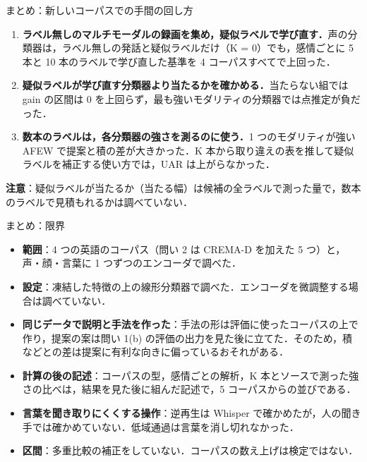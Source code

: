 \begin{frame}{まとめ：新しいコーパスでの手間の回し方}
\footnotesize
\begin{enumerate}\setlength\itemsep{5pt}
\item \textbf{ラベル無しのマルチモーダルの録画を集め，疑似ラベルで学び直す．}声の分類器は，ラベル無しの発話と疑似ラベルだけ（K = 0）でも，感情ごとに 5 本と 10 本のラベルで学び直した基準を 4 コーパスすべてで上回った．
\item \textbf{疑似ラベルが学び直す分類器より当たるかを確かめる．}当たらない組では gain の区間は 0 を上回らず，最も強いモダリティの分類器では点推定が負だった．
\item \textbf{数本のラベルは，各分類器の強さを測るのに使う．}1 つのモダリティが強い AFEW で提案と積の差が大きかった．K 本から取り違えの表を推して疑似ラベルを補正する使い方では，UAR は上がらなかった．
\end{enumerate}
\vspace{0.4em}
\textbf{注意}：疑似ラベルが当たるか（当たる幅）は候補の全ラベルで測った量で，数本のラベルで見積もれるかは調べていない．
\end{frame}

\begin{frame}{まとめ：限界}
\footnotesize
\begin{itemize}\setlength\itemsep{4pt}
\item \textbf{範囲}：4 つの英語のコーパス（問い 2 は CREMA-D を加えた 5 つ）と，声・顔・言葉に 1 つずつのエンコーダで調べた．
\item \textbf{設定}：凍結した特徴の上の線形分類器で調べた．エンコーダを微調整する場合は調べていない．
\item \textbf{同じデータで説明と手法を作った}：手法の形は評価に使ったコーパスの上で作り，提案の案は問い 1(b) の評価の出力を見た後に立てた．そのため，積などとの差は提案に有利な向きに偏っているおそれがある．
\item \textbf{計算の後の記述}：コーパスの型，感情ごとの解析，K 本とソースで測った強さの比べは，結果を見た後に組んだ記述で，5 コーパスからの並びである．
\item \textbf{言葉を聞き取りにくくする操作}：逆再生は Whisper で確かめたが，人の聞き手では確かめていない．低域通過は言葉を消し切れなかった．
\item \textbf{区間}：多重比較の補正をしていない．コーパスの数え上げは検定ではない．
\end{itemize}
\end{frame}

\appendix
